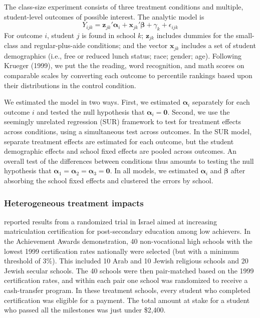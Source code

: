 \documentclass[12pt]{article}
\newcommand{\bm}{\mathbf}
\newcommand{\bs}{\boldsymbol}
\begin{document}
The class-size experiment consists of three treatment conditions and multiple, student-level outcomes of possible interest. The analytic model is 
\begin{equation}
Y_{ijk} = \bm{z}_{jk}'\bs\alpha_i + \bm{x}_{jk}'\bs\beta + \gamma_k + \epsilon_{ijk}
\end{equation}
For outcome $i$, student $j$ is found in school $k$; $\bm{z}_{jk}$ includes dummies for the small-class and regular-plus-aide conditions; and the vector $\bm{x}_{jk}$ includes a set of student demographics (i.e., free or reduced lunch status; race; gender; age). Following Krueger (1999), we put the the reading, word recognition, and math scores on comparable scales by converting each outcome to percentile rankings based upon their distributions in the control condition.

We estimated the model in two ways. First, we estimated $\bs\alpha_i$ separately for each outcome $i$ and tested the null hypothesis that $\bs\alpha_i = \bm{0}$. Second, we use the seemingly unrelated regression (SUR) framework to test for treatment effects across conditions, using a simultaneous test across outcomes. In the SUR model, separate treatment effects are estimated for each outcome, but the student demographic effects and school fixed effects are pooled across outcomes. An overall test of the differences between conditions thus amounts to testing the null hypothesis that $\bs\alpha_1 = \bs\alpha_2 = \bs\alpha_3 = \bm{0}$. In all models, we estimated $\bs\alpha_i$ and $\bs\beta$ after absorbing the school fixed effects and clustered the errors by school.

\subsubsection{Heterogeneous treatment impacts} 

\citet{Angrist2009effects} reported results from a randomized trial in Israel aimed at increasing matriculation certification for post-secondary education among low achievers. 
In the Achievement Awards demonstration, 40 non-vocational high schools with the lowest 1999 certification rates nationally were selected (but with a  minimum threshold of 3\%). This included 10 Arab and 10 Jewish religious schools and 20 Jewish secular schools. The 40 schools were then pair-matched based on the 1999 certification rates, and within each pair one school was randomized to receive a cash-transfer program. In these treatment schools, every student who completed certification was eligible for a payment. The total amount at stake for a student who passed all the milestones was just under \$2,400.   
\end{document}

